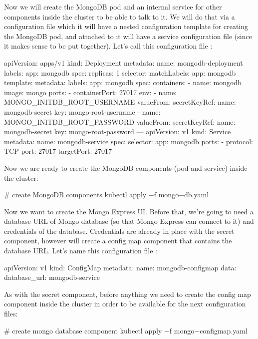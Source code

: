Now we will create the MongoDB pod and an internal service for other components inside the cluster to be able to talk
to it. We will do that via a configuration file which it will have a nested configuration template for creating the
MongoDB pod, and attached to it will have a service configuration file (since it makes sense to be put together). Let's
call this configuration file :
\begin{block}
apiVersion: apps/v1
kind: Deployment
metadata:
  name: mongodb-deployment
  labels:
    app: mongodb
spec:
  replicas: 1
  selector:
    matchLabels:
      app: mongodb
  template:
    metadata:
      labels:
        app: mongodb
    spec:
      containers:
      - name: mongodb
        image: mongo
        ports:
        - containerPort: 27017
        env:
        - name: MONGO_INITDB_ROOT_USERNAME
          valueFrom:
            secretKeyRef:
              name: mongodb-secret
              key: mongo-root-username
        - name: MONGO_INITDB_ROOT_PASSWORD
          valueFrom:
            secretKeyRef:
              name: mongodb-secret
              key: mongo-root-password
---
apiVersion: v1
kind: Service
metadata:
  name: mongodb-service
spec:
  selector:
    app: mongodb
  ports:
    - protocol: TCP
      port: 27017
      targetPort: 27017
\end{block}

Now we are ready to create the MongoDB components (pod and service) inside the cluster:
\begin{bash}
# create MongoDB components
kubectl apply $-$f mongo$-$db.yaml
\end{bash}

Now we want to create the Mongo Express UI. Before that, we're going to need a database URL of Mongo database (so that
Mongo Express can connect to it) and credentials of the database. Credentials are already in place with the secret
component, however will create a config map component that contains the database URL. Let's name this configuration
file :
\begin{block}
apiVersion: v1
kind: ConfigMap
metadata:
  name: mongodb-configmap
data:
  database_url: mongodb-service
\end{block}

As with the secret component, before anything we need to create the config map component inside the cluster in order
to be available for the next configuration files:
\begin{bash}
# create mongo database component
kubectl apply $-$f mongo$-$configmap.yaml
\end{bash}

